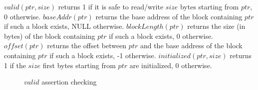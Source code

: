 \documentclass[a4paper,11pt]{article}
\newcommand{\highl}{\colorbox{gray!30}}
\begin{document}

$valid(ptr, size)$ returns 1 if it is safe to read/write $size$ bytes starting
from $ptr$, 0 otherwise. $baseAddr(ptr)$ returns the base address of the block
containing $ptr$ if such a block exists, NULL otherwise. $blockLength(ptr)$
returns the size (in bytes) of the block containing $ptr$ if such a block
exists, 0 otherwise. $offset(ptr)$ returns the offset between $ptr$ and the base
address of the block containing $ptr$ if such a block exists, -1 otherwise.
$initialized(ptr, size)$ returns 1 if the $size$ first bytes starting from
$ptr$ are initialized, 0 otherwise.


\begin{figure}[h]
  \begin{center}
  \end{center}
  \caption{$valid$ assertion checking}
\end{figure}




\end{document}
